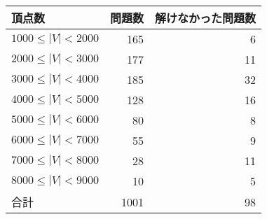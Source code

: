\begin{table}[t]\scriptsize
  \centering
  \renewcommand{\arraystretch}{1.2}
  \begin{tabular}{lr|r}
    頂点数 & 問題数 & 解けなかった問題数\\
   \hline
    $1000 \leq |V| < 2000$  & 165   & 6\\
    $2000 \leq |V| < 3000$  & 177   & 11\\
    $3000 \leq |V| < 4000$  & 185   & 32\\
    $4000 \leq |V| < 5000$  & 128   & 16\\
    $5000 \leq |V| < 6000$  & 80    & 8\\
    $6000 \leq |V| < 7000$  & 55    & 9\\
    $7000 \leq |V| < 8000$  & 28    & 11\\
    $8000 \leq |V| < 9000$  & 10    & 5\\
   \hline
    合計 & 1001 & 98  
  \end{tabular}
\end{table}







